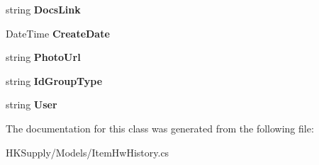 \begin{DoxyCompactItemize}
\item 
\mbox{\label{class_h_k_supply_1_1_models_1_1_item_hw_history_a5188c88a80aa43796a07f4bdcbb25ebf}} 
string {\bfseries Docs\+Link}
\item 
\mbox{\label{class_h_k_supply_1_1_models_1_1_item_hw_history_ad9a36ca1f92835b26c442e9ff78f3f52}} 
Date\+Time {\bfseries Create\+Date}
\item 
\mbox{\label{class_h_k_supply_1_1_models_1_1_item_hw_history_ad06dde696576334f5c01d2d0c8941c55}} 
string {\bfseries Photo\+Url}
\item 
\mbox{\label{class_h_k_supply_1_1_models_1_1_item_hw_history_a78bd0fe3bf5f6b730be8eb4f4c50c493}} 
string {\bfseries Id\+Group\+Type}
\item 
\mbox{\label{class_h_k_supply_1_1_models_1_1_item_hw_history_aff16ca8bf3fb94d42b491ace56cdfe71}} 
string {\bfseries User}
\end{DoxyCompactItemize}


The documentation for this class was generated from the following file\+:\begin{DoxyCompactItemize}
\item 
H\+K\+Supply/\+Models/Item\+Hw\+History.\+cs\end{DoxyCompactItemize}
